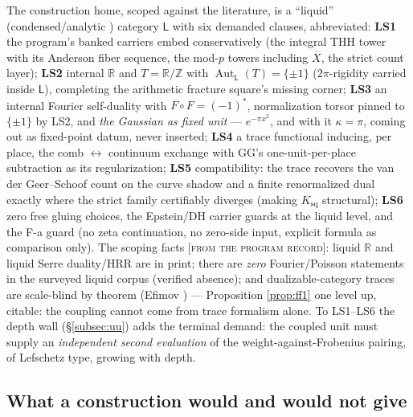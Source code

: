 \documentclass[11pt,reqno]{amsart}
\theoremstyle{plain}
\theoremstyle{definition}
\theoremstyle{remark}
\newcommand{\R}{\mathbb{R}}
\newcommand{\Z}{\mathbb{Z}}
\newcommand{\Xbar}{\overline{X}}
\newcommand{\grade}[1]{\textup{[\textsc{#1}]}}
\DeclareMathOperator{\Aut}{Aut}
\begin{document}
The construction home, scoped against the literature, is a ``liquid'' (condensed/analytic
\cite{ClausenScholze}) category $\mathsf{L}$ with six demanded clauses, abbreviated:
\textbf{LS1} the program's banked carriers embed conservatively (the integral THH tower with
its Anderson fiber sequence, the mod-$p$ towers including $\Xbar$, the strict count layer);
\textbf{LS2} internal $\R$ and $T = \R/\Z$ with $\Aut_{\mathsf L}(T) = \{\pm 1\}$
($2\pi$-rigidity carried inside $\mathsf{L}$), completing the arithmetic fracture square's
missing corner; \textbf{LS3} an internal Fourier self-duality with $F \circ F = (-1)^*$,
normalization torsor pinned to $\{\pm 1\}$ by LS2, and \emph{the Gaussian as fixed unit} ---
$e^{-\pi x^2}$, and with it $\kappa = \pi$, coming out as fixed-point datum, never inserted;
\textbf{LS4} a trace functional inducing, per place, the comb $\leftrightarrow$ continuum
exchange with GG's one-unit-per-place subtraction as its regularization; \textbf{LS5}
compatibility: the trace recovers the van der Geer--Schoof count on the curve shadow and a
finite renormalized dual exactly where the strict family certifiably diverges (making
$K_{\mathrm{sq}}$ structural); \textbf{LS6} zero free gluing choices, the Epstein/DH carrier
guards at the liquid level, and the F-a guard (no zeta continuation, no zero-side input,
explicit formula as comparison only). The scoping facts \grade{from the program record}:
liquid $\R$ and liquid Serre duality/HRR are in print; there are \emph{zero}
Fourier/Poisson statements in the surveyed liquid corpus (verified absence); and
dualizable-category traces are scale-blind by theorem (Efimov \cite{Efimov24}) --- Proposition
\ref{prop:ff1} one level up, citable: the coupling cannot come from trace formalism alone.
To LS1--LS6 the depth wall (\S\ref{subsec:uu}) adds the terminal demand: the coupled unit
must supply an \emph{independent second evaluation} of the weight-against-Frobenius pairing,
of Lefschetz type, growing with depth.

\subsection{What a construction would and would not give}
\end{document}

